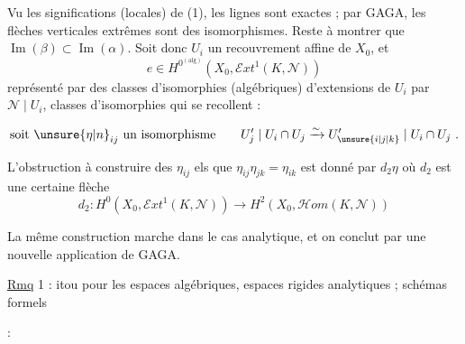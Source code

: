 Vu les significations (locales) de (1), les lignes sont exactes ; par GAGA, les flèches verticales extrêmes sont des isomorphismes. Reste à  montrer que \(\operatorname{Im}(\beta)\subset\operatorname{Im}(\alpha)\).
\clearpage
{}
\noindent Soit donc \(U_i\) un recouvrement affine de \(X_0\), et
\[
 e\in H^{0^{(\mathrm{alg})}}(X_0,\mathscr{E}xt^1(K,\mathscr{N}))
\]
représenté par des classes d'isomorphies (algébriques) d'extensions  de \(U_i\) par \(\mathscr{N}\mid U_i\), classes d'isomorphies qui se recollent :

\[
 \text{soit }\unsure{\eta|n}_{ij}\text{ un isomorphisme}\qquad
 U'_j\mid U_i\cap U_j
 \xrightarrow{\sim}
 U'_{\unsure{i|j|k}}\mid U_i\cap U_j\ .
\]

L'obstruction à construire des \(\eta_{ij}\) els que \(\eta_{ij}\eta_{jk}=\eta_{ik}\) est donné par \(d_2\eta\) où \(d_2\) est une certaine flèche
\[
 d_2:H^0(X_0,\mathscr{E}xt^1(K,\mathscr{N}))\longrightarrow
 H^2(X_0,\mathscr{H}om(K,\mathscr{N}))
\]

La même construction marche dans le cas analytique, et on conclut par une nouvelle application de GAGA.

\uline{Rmq} 1 : itou pour les espaces algébriques, espaces rigides analytiques ; schémas formels

 :

